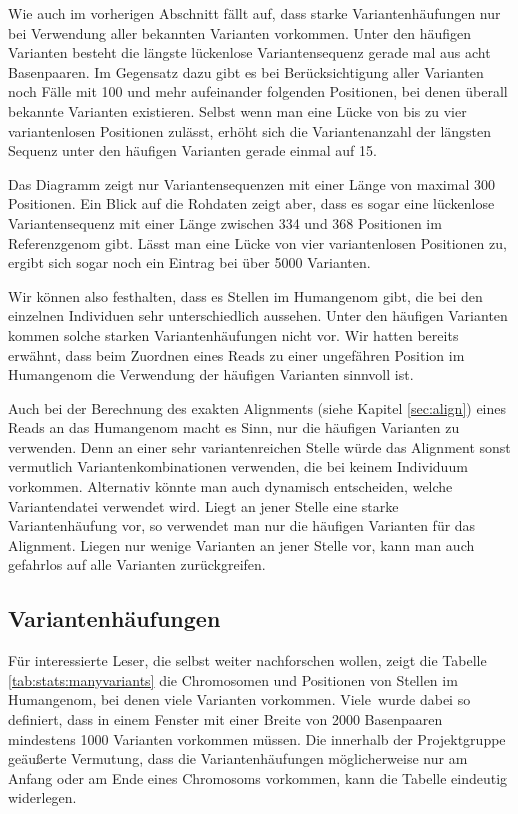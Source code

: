 Wie auch im vorherigen Abschnitt fällt auf, dass starke Variantenhäufungen nur bei Verwendung aller bekannten Varianten vorkommen. Unter den häufigen Varianten besteht die längste lückenlose Variantensequenz gerade mal aus acht Basenpaaren. Im Gegensatz dazu gibt es bei Berücksichtigung aller Varianten noch Fälle mit 100 und mehr aufeinander folgenden Positionen, bei denen überall bekannte Varianten existieren. Selbst wenn man eine Lücke von bis zu vier variantenlosen Positionen zulässt, erhöht sich die Variantenanzahl der längsten Sequenz unter den häufigen Varianten gerade einmal auf 15. 

Das Diagramm zeigt nur Variantensequenzen mit einer Länge von maximal 300 Positionen. Ein Blick auf die Rohdaten zeigt aber, dass es sogar eine lückenlose Variantensequenz mit einer Länge zwischen 334 und 368 Positionen im Referenzgenom gibt. Lässt man eine Lücke von vier variantenlosen Positionen zu, ergibt sich sogar noch ein Eintrag bei über 5000 Varianten. 

Wir können also festhalten, dass es Stellen im Humangenom gibt, die bei den einzelnen Individuen sehr unterschiedlich aussehen. Unter den häufigen Varianten kommen solche starken Variantenhäufungen nicht vor. Wir hatten bereits erwähnt, dass beim Zuordnen eines Reads zu einer ungefähren Position im Humangenom die Verwendung der häufigen Varianten sinnvoll ist.

Auch bei der Berechnung des exakten Alignments (siehe Kapitel \ref{sec:align}) eines Reads an das Humangenom macht es Sinn, nur die häufigen Varianten zu verwenden. Denn an einer sehr variantenreichen Stelle würde das Alignment sonst vermutlich Variantenkombinationen verwenden, die bei keinem Individuum vorkommen. Alternativ könnte man auch dynamisch entscheiden, welche Variantendatei verwendet wird. Liegt an jener Stelle eine starke Variantenhäufung vor, so verwendet man nur die häufigen Varianten für das Alignment. Liegen nur wenige Varianten an jener Stelle vor, kann man auch gefahrlos auf alle Varianten zurückgreifen.

\subsection{Variantenhäufungen}
\label{sec:stats:res:manyvariants}

Für interessierte Leser, die selbst weiter nachforschen wollen, zeigt die Tabelle \ref{tab:stats:manyvariants} die Chromosomen und Positionen von Stellen im Humangenom, bei denen viele Varianten vorkommen. \glqq Viele\grqq\ wurde dabei so definiert, dass in einem Fenster mit einer Breite von 2000 Basenpaaren mindestens 1000 Varianten vorkommen müssen. Die innerhalb der Projektgruppe geäußerte Vermutung, dass die Variantenhäufungen möglicherweise nur am Anfang oder am Ende eines Chromosoms vorkommen, kann die Tabelle eindeutig widerlegen.

